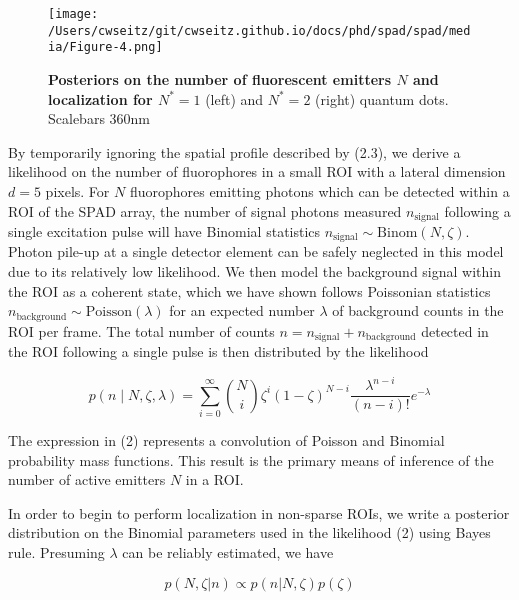 \begin{figure}[t]
\centering
\texttt{[image: /Users/cwseitz/git/cwseitz.github.io/docs/phd/spad/spad/media/Figure-4.png]}
\caption{\textbf{Posteriors on the number of fluorescent emitters $N$ and localization for $N^{*}=1$} (left) and $N^{*}=2$ (right) quantum dots. Scalebars 360nm}
\label{fig:fig7}
\end{figure}   

By temporarily ignoring the spatial profile described by (2.3), we derive a likelihood on the number of fluorophores in a small ROI with a lateral dimension $d = 5$ pixels. For $N$ fluorophores emitting photons which can be detected within a ROI of the SPAD array, the number of signal photons measured $n_{\mathrm{signal}}$ following a single excitation pulse will have Binomial statistics $n_{\mathrm{signal}} \sim \mathrm{Binom}(N,\zeta)$. Photon pile-up at a single detector element can be safely neglected in this model due to its relatively low likelihood. We then model the background signal within the ROI as a coherent state, which we have shown follows Poissonian statistics $n_{\mathrm{background}} \sim \mathrm{Poisson}(\lambda)$ for an expected number $\lambda$ of background counts in the ROI per frame. The total number of counts $n=n_{\mathrm{signal}}+n_{\mathrm{background}}$ detected in the ROI following a single pulse is then distributed by the likelihood

\begin{equation}
p(n \mid N,\zeta,\lambda) = \sum_{i=0}^{\infty} \binom{N}{i} \zeta^i (1-\zeta)^{N-i} \frac{\lambda^{n-i}}{(n-i)!} e^{-\lambda}
\end{equation}

The expression in (2) represents a convolution of Poisson and Binomial probability mass functions. This result is the primary means of inference of the number of active emitters $N$ in a ROI.

In order to begin to perform localization in non-sparse ROIs, we write a posterior distribution on the Binomial parameters used in the likelihood (2) using Bayes rule. Presuming $\lambda$ can be reliably estimated, we have

\begin{equation}
p(N,\zeta\lvert n) \propto p(n\lvert N,\zeta)p(\zeta)
\end{equation}

